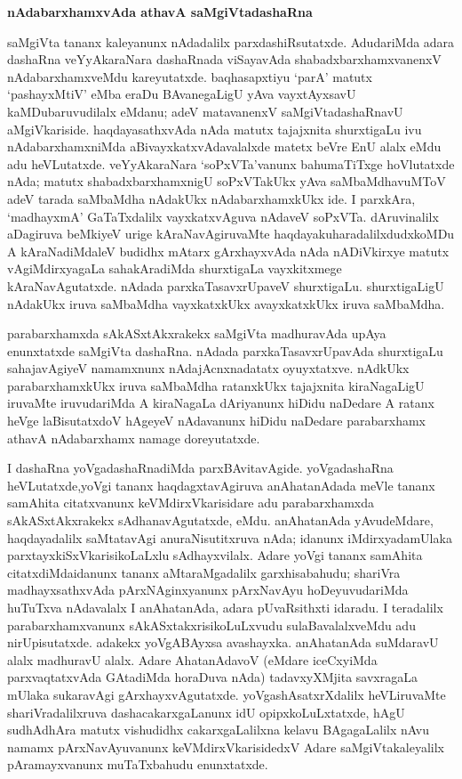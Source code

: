 \newpage

\begin{center}
{\Large\bf nAdabarxhamxvAda athavA saMgiVtadashaRna}
\end{center}

saMgiVta tananx kaleyanunx nAdadalilx parxdashiRsutatxde. AdudariMda adara dashaRna veYyAkaraNara dashaRnada viSayavAda shabadxbarxhamxvanenxV nAdabarxhamxveMdu kareyutatxde. baqhasapxtiyu `parA' matutx `pashayxMtiV' eMba eraDu BAvanegaLigU yAva vayxtAyxsavU kaMDubaruvudilalx eMdanu; adeV matavanenxV saMgiVtadashaRnavU aMgiVkariside. haqdayasathxvAda nAda matutx tajajxnita shurxtigaLu ivu nAdabarxhamxniMda aBivayxkatxvAdavalalxde matetx beVre EnU alalx eMdu adu heVLutatxde. veYyAkaraNara `soPxVTa'vanunx bahumaTiTxge hoVlutatxde nAda; matutx shabadxbarxhamxnigU soPxVTakUkx yAva saMbaMdhavuMToV adeV tarada saMbaMdha nAdakUkx nAdabarxhamxkUkx ide. I parxkAra, `madhayxmA' GaTaTxdalilx vayxkatxvAguva nAdaveV soPxVTa. dAruvinalilx aDagiruva beMkiyeV urige kAraNavAgiruvaMte haqdayakuharadalilxdudxkoMDu A kAraNadiMdaleV budidhx mAtarx gArxhayxvAda nAda nADiVkirxye matutx vAgiMdirxyagaLa sahakAradiMda shurxtigaLa vayxkitxmege kAraNavAgutatxde. nAdada parxkaTasavxrUpaveV shurxtigaLu. shurxtigaLigU nAdakUkx iruva saMbaMdha vayxkatxkUkx avayxkatxkUkx iruva saMbaMdha.

parabarxhamxda sAkASxtAkxrakekx saMgiVta madhuravAda upAya enunxtatxde saMgiVta dashaRna. nAdada parxkaTasavxrUpavAda shurxtigaLu sahajavAgiyeV namamxnunx nAdajAcnxnadatatx oyuyxtatxve. nAdkUkx parabarxhamxkUkx iruva saMbaMdha ratanxkUkx tajajxnita kiraNagaLigU iruvaMte iruvudariMda A kiraNagaLa dAriyanunx hiDidu naDedare A ratanx heVge laBisutatxdoV hAgeyeV nAdavanunx hiDidu naDedare parabarxhamx athavA nAdabarxhamx namage doreyutatxde.

I dashaRna yoVgadashaRnadiMda parxBAvitavAgide. yoVgadashaRna heVLutatxde,\break yoVgi tananx haqdagxtavAgiruva anAhatanAdada meVle tananx samAhita citatxvanunx keVMdirxV\-karisidare adu parabarxhamxda sAkASxtAkxrakekx sAdhanavAgutatxde, eMdu. anAhatanAda yAvu\break\-deMdare, haqdayadalilx saMtatavAgi anuraNisutitxruva nAda; idanunx iMdirxyada\break mUlaka parxtayxkiSxVkarisikoLaLxlu sAdhayxvilalx. Adare yoVgi tananx samAhita citatxdiMda\break idanunx tananx aMtaraMgadalilx garxhisabahudu; shariVra madhayxsathxvAda pArxNAginxyanunx pArxNa\-vAyu hoDeyuvudariMda huTuTxva nAdavalalx I anAhatanAda, adara pUvaR\-sithxti idaradu. I teradalilx parabarxhamxvanunx sAkASxtakxrisikoLuLxvudu sulaBavalalxveMdu adu nirUpisutatxde. adakekx yoVgABAyxsa avashayxka. anAhatanAda suMdaravU alalx madhu\break\-ravU alalx. Adare AhatanAdavoV (eMdare iceCxyiMda parxvaqtatxvAda GAtadiMda hora\-Duva nAda) tadavxyXMjita savxragaLa mUlaka sukaravAgi gArxhayxvAgutatxde. yoVga\-shAsatxrX\-dalilx heVLiruvaMte shariVradalilxruva dashacakarxgaLanunx idU opipxkoLuLxtatxde, hAgU sudhA\-dhAra matutx vishudidhx cakarxgaLalilxna kelavu BAgagaLalilx nAvu namamx pArxNavAyuvanunx keVMdirxVkari\-sidedxV Adare saMgiVtakaleyalilx pAramayxvanunx muTaTxbahudu enunxtatxde.

